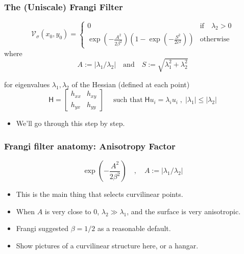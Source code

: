 \documentclass[9pt,notes]{beamer}
\newcommand{\Vsigma}{\ensuremath{\mathcal{V}_{\sigma}}\xspace}
\begin{document}
\begin{frame}
\frametitle{The (Uniscale) Frangi Filter}
  \begin{equation}
  \Vsigma(x_0,y_0) =
  \begin{cases}
  0 & \text{if} \quad \lambda_2 > 0 \\
  \exp\left(-\frac{A^2}{2\beta^2}\right)
  \left(1 - \exp\left(-\frac{S^2}{2c^2}\right)\right) & \textrm{otherwise}
  \end{cases}
  \end{equation}
where
  \begin{equation}
  A := \left|\lambda_1 / \lambda_2\right|
  \quad \textrm{and} \quad 
  S := \sqrt{\lambda_1^2 + \lambda_2^2}
  \end{equation}

for eigenvalues $\lambda_1, \lambda_2$ of the Hessian (defined at each point)
  \begin{equation}
    \mathsf{H} = \begin{bmatrix} h_{xx} & h_{xy} \\
                                 h_{yx} & h_{yy}
                 \end{bmatrix}
    \quad \;\textrm{such that}\;
    \mathsf{H} u_i = \lambda_i u_i \;,\;
    \left|\lambda_1\right| \leq \left|\lambda_2\right|
  \end{equation}
  
  \begin{itemize}
    \item We'll go through this step by step.
  \end{itemize}
\end{frame}

\begin{frame}
\frametitle[Anisotropy Factor]{Frangi filter anatomy: Anisotropy Factor}
\begin{equation}
\exp\left(-\frac{A^2}{2\beta^2}\right) \quad,\quad
A := \left|\lambda_1 / \lambda_2\right|
\end{equation}
\begin{itemize}
  \item This is the main thing that selects curvilinear points.
  \item When $A$ is very close to 0, $\lambda_2 \gg \lambda_1$, and the surface is very anisotropic.
  \item Frangi suggested $\beta=1/2$ as a reasonable default.
  \item Show pictures of a curvilinear structure here, or a hangar.
\end{itemize}
\end{frame}
\end{document}
